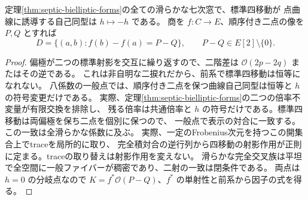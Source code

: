 \begin{corollary}\label{cor:septic-canonical-monodromy}
定理\ref{thm:septic-bielliptic-forms}の全ての滑らかな七次窓で、標準四移動が
点曲線に誘導する自己同型は $h\mapsto-h$ である。
商を $f:C\to E$、順序付き二点の像を $P,Q$ とすれば
\[
 D=\{(a,b):f(b)-f(a)=P-Q\},\qquad P-Q\in E[2]\setminus\{0\}.
\]
\end{corollary}
\begin{proof}
偏極が二つの標準射影を交互に繰り返すので、二階差は $\mathcal O(2p-2q)$ またはその逆である。
これは非自明な二捩れだから、前系で標準四移動は恒等になれない。
八係数の一般点では、順序付き二点を保つ曲線自己同型は恒等と $h$ の符号変更だけである。
実際、定理\ref{thm:septic-bielliptic-forms}の二つの倍率不変量が有限交換を排除し、
残る倍率は共通倍率と $h$ の符号だけである。標準四移動は両偏極を保ち二点を個別に保つので、
一般点で表示の対合に一致する。この一致は全滑らかな係数に及ぶ。
実際、一定のFrobenius次元を持つこの開集合上でtraceを局所的に取り、
完全積対合の逆行列から四移動の射影作用が正則に定まる。traceの取り替えは射影作用を変えない。
滑らかな完全交叉族は平坦で全空間に一般ファイバーが稠密であり、二射の一致は閉条件である。
両点は $h=0$ の分岐点なので $K=f^*\mathcal O(P-Q)$、$f^*$ の単射性と前系から因子の式を得る。
\end{proof}
